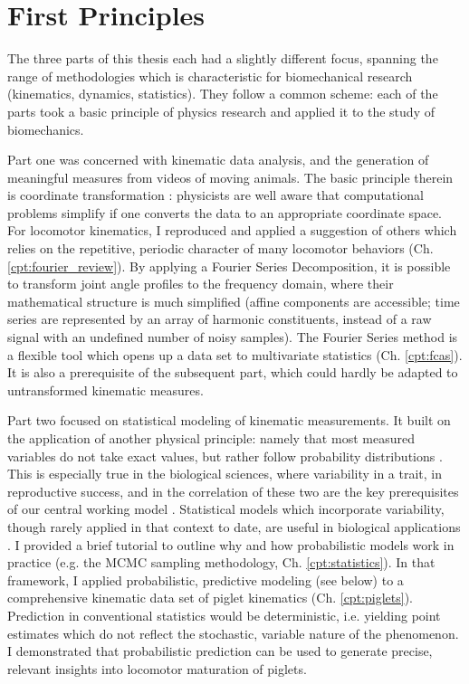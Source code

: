 \section{First Principles}
\label{sec:org7d5b8e1}
The three parts of this thesis each had a slightly different focus, spanning the range of methodologies which is characteristic for biomechanical research (kinematics, dynamics, statistics).
They follow a common scheme:
each of the parts took a basic principle of physics research and applied it to the study of biomechanics.


Part one was concerned with kinematic data analysis, and the generation of meaningful measures from videos of moving animals.
The basic principle therein is coordinate transformation \citep{Tipler2007}: physicists are well aware that computational problems simplify if one converts the data to an appropriate coordinate space.
For locomotor kinematics, I reproduced and applied a suggestion of others \citep{Bernstein1927a,Webb2007} which relies on the repetitive, periodic character of many locomotor behaviors (Ch. \ref{cpt:fourier_review}).
By applying a Fourier Series Decomposition, it is possible to transform joint angle profiles to the frequency domain, where their mathematical structure is much simplified (affine components are accessible; time series are represented by an array of harmonic constituents, instead of a raw signal with an undefined number of noisy samples).
The Fourier Series method is a flexible tool which opens up a data set to multivariate statistics (Ch. \ref{cpt:fcas}).
It is also a prerequisite of the subsequent part, which could hardly be adapted to untransformed kinematic measures.


Part two focused on statistical modeling of kinematic measurements.
It built on the application of another physical principle: namely that most measured variables do not take exact values, but rather follow probability distributions \citep{2022Probability}.
This is especially true in the biological sciences, where variability in a trait, in reproductive success, and in the correlation of these two are the key prerequisites of our central working model \citep{Darwin1859}.
Statistical models which incorporate variability, though rarely applied in that context to date, are useful in biological applications \citep{Roraas2019,DeGroote2021}.
I provided a brief tutorial to outline why and how probabilistic models work in practice (e.g. the MCMC sampling methodology, Ch. \ref{cpt:statistics}).
In that framework, I applied probabilistic, predictive modeling (see below) to a comprehensive kinematic data set of piglet kinematics (Ch. \ref{cpt:piglets}).
Prediction in conventional statistics would be deterministic, i.e. yielding point estimates which do not reflect the stochastic, variable nature of the phenomenon.
I demonstrated that probabilistic prediction can be used to generate precise, relevant insights into locomotor maturation of piglets.


